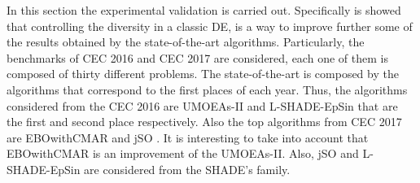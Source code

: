 In this section the experimental validation is carried out.
%
Specifically is showed that controlling the diversity in a classic DE, is a way to improve further some of the results obtained by the state-of-the-art algorithms.
%
Particularly, the benchmarks of CEC 2016 and CEC 2017 are considered, each one of them is composed of thirty different problems.
%
The state-of-the-art is composed by the algorithms that correspond to the first places of each year.
%
Thus, the algorithms considered from the CEC 2016 are UMOEAs-II \cite{elsayed2016testing} and L-SHADE-EpSin \cite{awad2016ensemble} that are the first and second place respectively.
%
Also the top algorithms from CEC 2017 are EBOwithCMAR \cite{kumar2017improving} and jSO \cite{brest2017single}.
%
It is interesting to take into account that EBOwithCMAR is an improvement of the UMOEAs-II.
%
Also, jSO and L-SHADE-EpSin are considered from the SHADE's family.


